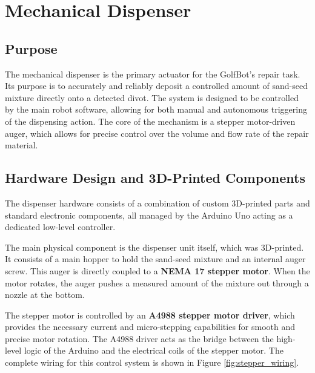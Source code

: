 \section{Mechanical Dispenser}
\label{sec:dispenser_implementation}

\subsection{Purpose}
\label{ssec:dispenser_intro}
The mechanical dispenser is the primary actuator for the GolfBot's repair task. Its purpose is to accurately and reliably deposit a controlled amount of sand-seed mixture directly onto a detected divot. The system is designed to be controlled by the main robot software, allowing for both manual and autonomous triggering of the dispensing action. The core of the mechanism is a stepper motor-driven auger, which allows for precise control over the volume and flow rate of the repair material.
\subsection{Hardware Design and 3D-Printed Components}
\label{ssec:dispenser_hardware}
The dispenser hardware consists of a combination of custom 3D-printed parts and standard electronic components, all managed by the Arduino Uno acting as a dedicated low-level controller.

The main physical component is the dispenser unit itself, which was 3D-printed. It consists of a main hopper to hold the sand-seed mixture and an internal auger screw. This auger is directly coupled to a \textbf{NEMA 17 stepper motor}. When the motor rotates, the auger pushes a measured amount of the mixture out through a nozzle at the bottom.

The stepper motor is controlled by an \textbf{A4988 stepper motor driver}, which provides the necessary current and micro-stepping capabilities for smooth and precise motor rotation. The A4988 driver acts as the bridge between the high-level logic of the Arduino and the electrical coils of the stepper motor. The complete wiring for this control system is shown in Figure \ref{fig:stepper_wiring}.

